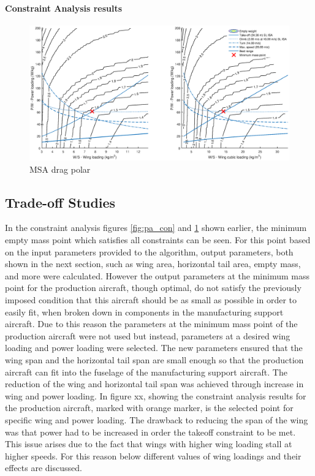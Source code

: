 \paragraph{Constraint Analysis results}
\begin{figure}[H]
    \centering
    \includegraphics[width=\textwidth]{./preliminary_design/fig/msa_con}
    \caption{MSA drag polar}
    \label{fig:msa_con}
\end{figure}




\subsection{Trade-off Studies}

In the constraint analysis figures \ref{fig:pa_con} and \ref{fig:msa_con} shown earlier, the minimum empty mass point which satisfies all constraints can be seen. For this point based on the input parameters provided to the algorithm, output parameters, both shown in the next section, such as wing area, horizontal tail area, empty mass, and more were calculated. However the output parameters at the minimum mass point for the production aircraft, though optimal, do not satisfy the previously imposed condition that this aircraft should be as small as possible in order to easily fit, when broken down in components in the manufacturing support aircraft. Due to this reason the parameters at the minimum mass point of the production aircraft were not used but instead, parameters at a desired wing loading  and power loading were selected. The new parameters ensured that the wing span and the horizontal tail span are small enough so that the production aircraft can fit into the fuselage of the manufacturing support aircraft. The reduction of the wing and horizontal tail span was achieved through increase in wing and power loading. In figure xx, showing the constraint analysis results for the production aircraft, marked with orange marker, is the selected point for specific wing and power loading. The drawback to reducing the span of the wing was that power had to be increased in order the takeoff constraint to be met. This issue arises due to the fact that wings with higher wing loading stall at higher speeds. For this reason below different values of wing loadings and their effects are discussed.

